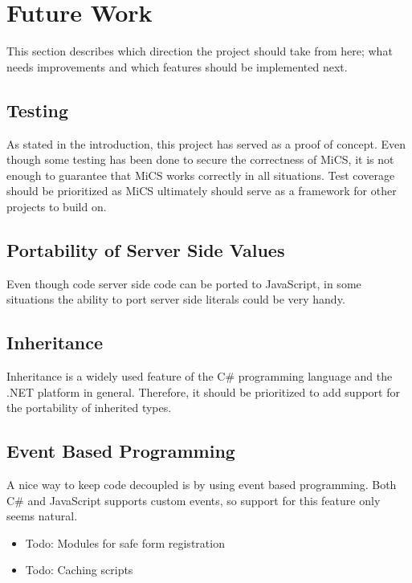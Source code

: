 
\section{Future Work}
This section describes which direction the project should take from here; what needs improvements and which features should be implemented next.

\subsection{Testing} %
\label{sub:fw_testing}
	As stated in the introduction, this project has served as a proof of concept. Even though some testing has been done to secure the correctness of MiCS, it is not enough to guarantee that MiCS works correctly in all situations. Test coverage should be prioritized as MiCS ultimately should serve as a framework for other projects to build on.

\subsection{Portability of Server Side Values} %
\label{sub:portability_of_server_side_values}
	Even though code server side code can be ported to JavaScript, in some situations the ability to port server side literals could be very handy. 

\subsection{Inheritance} %
\label{sub:fw_inheritance}
	Inheritance is a widely used feature of the C\# programming language and the .NET platform in general. Therefore, it should be prioritized to add support for the portability of inherited types.

\subsection{Event Based Programming} %
\label{sub:fw_event_based_programming}
	A nice way to keep code decoupled is by using event based programming. Both C\# and JavaScript supports custom events, so support for this feature only seems natural.

\begin{itemize}
	\item Todo: Modules for safe form registration
	\item Todo: Caching scripts
\end{itemize}